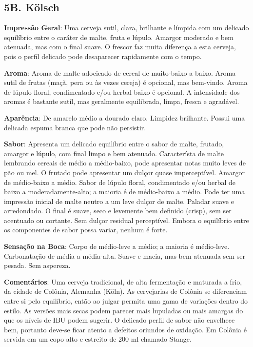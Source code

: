 \subsection*{5B. Kölsch}
\textbf{Impressão Geral}: Uma cerveja sutil, clara, brilhante e límpida com um delicado equilíbrio entre o caráter de malte, fruta e lúpulo. Amargor moderado e bem atenuada, mas com o final suave. O frescor faz muita diferença a esta cerveja, pois o perfil delicado pode desaparecer rapidamente com o tempo.

\textbf{Aroma}: Aroma de malte adocicado de cereal de muito-baixo a baixo. Aroma sutil de frutas (maçã, pera ou às vezes cereja) é opcional, mas bem-vindo. Aroma de lúpulo floral, condimentado e/ou herbal baixo é opcional. A intensidade dos aromas é bastante sutil, mas geralmente equilibrada, limpa, fresca e agradável.

\textbf{Aparência}: De amarelo médio a dourado claro. Limpidez brilhante. Possui uma delicada espuma branca que pode não persistir.

\textbf{Sabor}: Apresenta um delicado equilíbrio entre o sabor de malte, frutado, amargor e lúpulo, com final limpo e bem atenuado. Característa de malte lembrando cereais de médio a médio-baixo, pode apresentar notas muito leves de pão ou mel. O frutado pode apresentar um dulçor quase imperceptível. Amargor de médio-baixo a médio. Sabor de lúpulo floral, condimentado e/ou herbal de baixo a moderadamente-alto; a maioria é de médio-baixo a médio. Pode ter uma impressão inicial de malte neutro a um leve dulçor de malte. Paladar suave e arredondado. O final é suave, seco e levemente bem definido (crisp), sem ser acentuado ou cortante. Sem dulçor residual perceptível. Embora o equilíbrio entre os componentes de sabor possa variar, nenhum é forte.

\textbf{Sensação na Boca}: Corpo de médio-leve a médio; a maioria é médio-leve. Carbonatação de média a média-alta. Suave e macia, mas bem atenuada sem ser pesada. Sem aspereza.

\textbf{Comentários}: Uma cerveja tradicional, de alta fermentação e maturada a frio, da cidade de Colônia, Alemanha (Köln). As cervejarias de Colônia se diferenciam entre si pelo equilíbrio, então ao julgar permita uma gama de variações dentro do estilo. As versões mais secas podem parecer mais lupuladas ou mais amargas do que os níveis de IBU podem sugerir. O delicado perfil de sabor não envelhece bem, portanto deve-se ficar atento a defeitos oriundos de oxidação. Em Colônia é servida em um copo alto e estreito de 200 ml chamado Stange.

